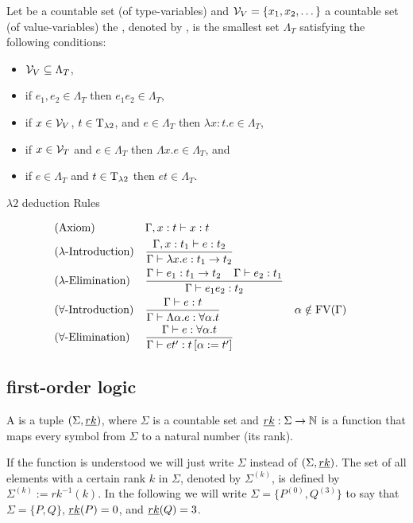 \begin{definition}
Let \lambdaTypVar{} be a countable set (of type-variables) and $\mathcal{V}_V=\{x_1,x_2,\dots\}$ a countable set (of value-variables) the , denoted by \lambdaTerms{}, is the smallest set $\Lambda_T$ satisfying the following conditions: %
\begin{itemize}
\item $\mathcal{V}_V\subseteq\Lambda_T$,
\item if $e_1,e_2\in\Lambda_T$ then $e_1e_2\in\Lambda_T$,
\item if $x\in\mathcal{V}_V$, $t\in\text{T}_{\lambda2}$, and $e\in\Lambda_T$ then $\lambda x:t.e\in\Lambda_T$,
\item if $x\in\mathcal{V}_T$ and $e\in\Lambda_T$ then $\Lambda x.e\in\Lambda_T$, and
\item if $e\in\Lambda_T$ and $t\in\text{T}_{\lambda2}$ then $et\in\Lambda_T$.
\end{itemize}
\end{definition}
$\lambda2$ deduction Rules
\begin{mdframed}
\begingroup
\addtolength{\jot}{0.3cm}
\begin{align*}
&(\text{Axiom}) &&\Gamma,x:t\vdash x:t\\
&(\lambda\text{-Introduction}) &&\frac{\Gamma,x:t_1\vdash e:t_2}{\Gamma\vdash \lambda x.e:t_1\to t_2}\\
&(\lambda\text{-Elimination}) &&\frac{\Gamma\vdash e_1:t_1\to t_2 \hspace{0.4cm}\Gamma\vdash e_2:t_1}{\Gamma\vdash e_1e_2:t_2}\\
&(\forall\text{-Introduction}) &&\frac{\Gamma\vdash e:t}{\Gamma\vdash \Lambda\alpha.e:\forall\alpha.t} &&\alpha\notin\text{FV}(\Gamma) \\
&(\forall\text{-Elimination}) &&\frac{\Gamma\vdash e:\forall\alpha.t }{\Gamma\vdash et':t\left[ \alpha:=t'\right] }
\end{align*}
\endgroup
\end{mdframed}

\subsection{first-order logic}
\begin{definition}
A  is a tuple $(\Sigma,\emph{rk})$, where $\Sigma$ is a countable set and $\emph{rk}:\Sigma\to\mathbb{N}$ is a function that maps every symbol from $\Sigma$ to a natural number (its rank).
\end{definition}
If the function \rank{} is understood we will just write $\Sigma$ instead of $(\Sigma,\emph{rk})$. The set of all elements with a certain rank $k$ in $\Sigma$, denoted by $\Sigma^{(k)}$, is defined by $\Sigma^{(k)}:=rk^{-1}(k)$. In the following we will write $\Sigma=\{P^{(0)},Q^{(3)}\}$ to say that $\Sigma=\{P,Q\}$, $\emph{rk}(P)=0$, and $\emph{rk}(Q)=3$.

